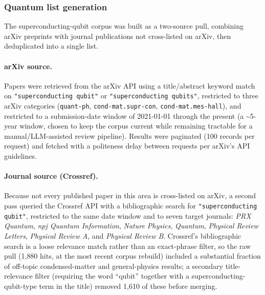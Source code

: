 \documentclass[11pt]{article}
\begin{document}
\subsubsection{Quantum list generation}
\label{sec:quantum-list-gen}

The superconducting-qubit corpus was built as a two-source pull, combining arXiv
preprints with journal publications not cross-listed on arXiv, then deduplicated into a
single list.

\paragraph{arXiv source.} Papers were retrieved from the arXiv API using a
title/abstract keyword match on \texttt{"superconducting qubit"} or
\texttt{"superconducting qubits"}, restricted to three arXiv categories
(\texttt{quant-ph}, \texttt{cond-mat.supr-con}, \texttt{cond-mat.mes-hall}), and
restricted to a submission-date window of 2021-01-01 through the present (a
\textasciitilde5-year window, chosen to keep the corpus current while remaining
tractable for a manual/LLM-assisted review pipeline). Results were paginated (100
records per request) and fetched with a politeness delay between requests per arXiv's
API guidelines.

\paragraph{Journal source (Crossref).} Because not every published paper in this area is
cross-listed on arXiv, a second pass queried the Crossref API with a bibliographic
search for \texttt{"superconducting qubit"}, restricted to the same date window and to
seven target journals: \emph{PRX Quantum}, \emph{npj Quantum Information},
\emph{Nature Physics}, \emph{Quantum}, \emph{Physical Review Letters}, \emph{Physical
Review A}, and \emph{Physical Review B}. Crossref's bibliographic search is a loose
relevance match rather than an exact-phrase filter, so the raw pull (1{,}880 hits, at
the most recent corpus rebuild) included a substantial fraction of off-topic
condensed-matter and general-physics results; a secondary title-relevance filter
(requiring the word ``qubit'' together with a superconducting-qubit-type term in the
title) removed 1{,}610 of these before merging.
\end{document}
